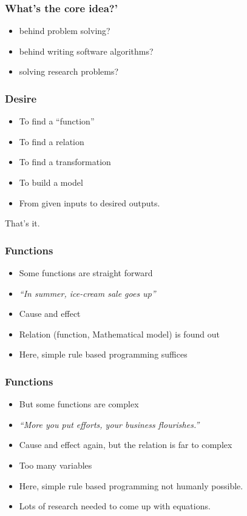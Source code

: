 \begin{frame}[fragile]\frametitle{What's the core idea?'}
\begin{itemize}
\item behind problem solving?
\item behind writing software algorithms?
\item solving research problems?
\end{itemize}
\end{frame}

\begin{frame}[fragile]\frametitle{Desire}
\begin{itemize}
\item To find a ``function''
\item To find a relation
\item To find a transformation
\item To build a model
\item From given inputs to desired outputs.
\end{itemize}
That's it.
\end{frame}

\begin{frame}[fragile]\frametitle{Functions}
\begin{itemize}
\item Some functions are straight forward
\item {\em ``In summer, ice-cream sale goes up''}
\item Cause and effect
\item Relation (function, Mathematical model) is found out
\item Here, simple rule based programming suffices
\end{itemize}
\end{frame}

\begin{frame}[fragile]\frametitle{Functions}
\begin{itemize}
\item But some functions are complex
\item {\em ``More you put efforts, your business flourishes.''}
\item Cause and effect again, but the relation is far to complex
\item Too many variables
\item Here, simple rule based programming not humanly possible.
\item Lots of research needed to come up with equations.
\end{itemize}
\end{frame}

